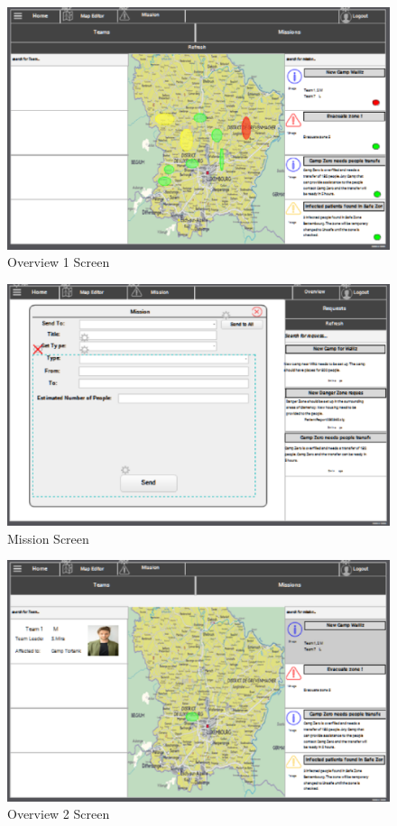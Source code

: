 \begin{figure}[htbp]
\begin{center}
 \caption{\label{fig:W6} Overview 1 Screen}
   \includegraphics[width=150mm]{./images/Web/coverview2.eps}
\end{center}
\end{figure}
\begin{figure}[htbp]
\begin{center}
 \caption{\label{fig:W8} Mission Screen}
   \includegraphics[width=150mm]{./images/Web/cmissionscreen.eps}
\end{center}
\end{figure}
\begin{figure}[htbp]
\begin{center}
 \caption{\label{fig:W7} Overview 2 Screen}
   \includegraphics[width=150mm]{./images/Web/coverview3.eps}
\end{center}
\end{figure}
